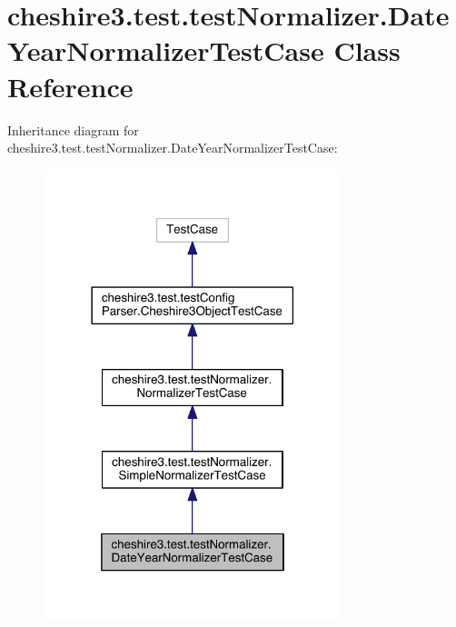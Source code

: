 \hypertarget{classcheshire3_1_1test_1_1test_normalizer_1_1_date_year_normalizer_test_case}{\section{cheshire3.\-test.\-test\-Normalizer.\-Date\-Year\-Normalizer\-Test\-Case Class Reference}
\label{classcheshire3_1_1test_1_1test_normalizer_1_1_date_year_normalizer_test_case}
}


Inheritance diagram for cheshire3.\-test.\-test\-Normalizer.\-Date\-Year\-Normalizer\-Test\-Case\-:
\nopagebreak
\begin{figure}[H]
\begin{center}
\leavevmode
\includegraphics[width=246pt]{classcheshire3_1_1test_1_1test_normalizer_1_1_date_year_normalizer_test_case__inherit__graph}
\end{center}
\end{figure}


